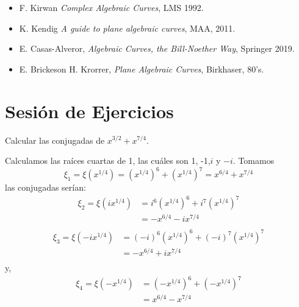 \documentclass[12pt]{report}
\newcounter{it}
\theoremstyle{largebreak}
\begin{document}
    \begin{itemize}
        \item F. Kirwan \textit{Complex Algebraic Curves}, LMS 1992.
        \item K. Kendig \textit{A guide to plane algebraic curves}, MAA, 2011.
        \item E. Casas-Alveror, \textit{Algebraic Curves, the Bill-Noether Way}, Springer 2019.
        \item E. Brickeson H. Krorrer, \textit{Plane Algebraic Curves}, Birkhaser, 80's.
    \end{itemize}

    \newpage

    \section{Sesión de Ejercicios}

    \begin{exa}
        Calcular las conjugadas de $x^{ 3/2}+x^{ 7/4}$.
    \end{exa}

    \begin{sol}
        Calculamos las raíces cuartas de 1, las cuáles son 1, -1,$i$ y $-i$. Tomamos
        \begin{equation*}
            \xi_1=\xi(x^{ 1/4})=(x^{1/4})^6+(x^{1/4})^7=x^{6/4}+x^{7/4}
        \end{equation*}
        las conjugadas serían:
        \begin{equation*}
            \begin{split}
                \xi_2=\xi(ix^{ 1/4})&=i^6(x^{1/4})^6+i^7(x^{1/4})^7\\
                &=-x^{6/4}-ix^{7/4}\\
            \end{split}
        \end{equation*}
        \begin{equation*}
            \begin{split}
                \xi_3=\xi(-ix^{ 1/4})&=(-i)^6(x^{1/4})^6+(-i)^7(x^{1/4})^7\\
                &=-x^{6/4}+ix^{7/4}\\
            \end{split}
        \end{equation*}
        y,
        \begin{equation*}
            \begin{split}
                \xi_4=\xi(-x^{ 1/4})&=(-x^{1/4})^6+(-x^{1/4})^7\\
                &=x^{6/4}-x^{7/4}\\
            \end{split}
        \end{equation*}
    \end{sol}
\end{document}
